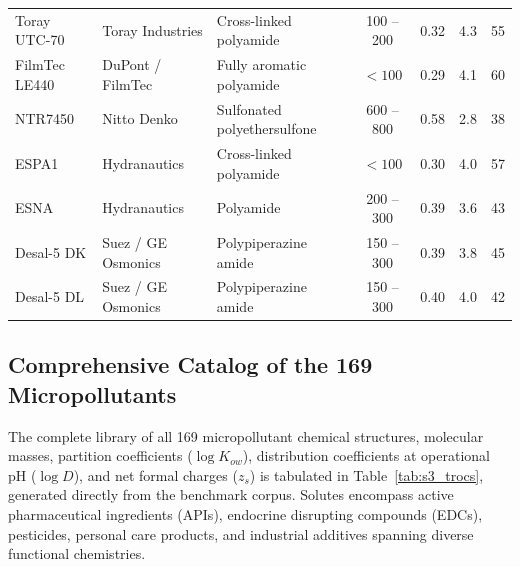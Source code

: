 \documentclass[11pt]{article}
\begin{document}
\begin{table}[H]
\begin{tabularx}{\textwidth}{>{\raggedright\arraybackslash}p{2.6cm} >{\raggedright\arraybackslash}p{2.8cm} >{\raggedright\arraybackslash}X c c c c}
Toray UTC-70     & Toray Industries           & Cross-linked polyamide      & 100 -- 200 & 0.32 & 4.3 & 55 \\
FilmTec LE440    & DuPont / FilmTec           & Fully aromatic polyamide    & $<100$     & 0.29 & 4.1 & 60 \\
NTR7450          & Nitto Denko                & Sulfonated polyethersulfone & 600 -- 800 & 0.58 & 2.8 & 38 \\
ESPA1            & Hydranautics               & Cross-linked polyamide      & $<100$     & 0.30 & 4.0 & 57 \\
ESNA             & Hydranautics               & Polyamide                   & 200 -- 300 & 0.39 & 3.6 & 43 \\
Desal-5 DK       & Suez / GE Osmonics         & Polypiperazine amide        & 150 -- 300 & 0.39 & 3.8 & 45 \\
Desal-5 DL       & Suez / GE Osmonics         & Polypiperazine amide        & 150 -- 300 & 0.40 & 4.0 & 42 \\
\bottomrule
\end{tabularx}
\end{table}

\subsection{Comprehensive Catalog of the 169 Micropollutants}
\label{sec:troc_catalog}
The complete library of all 169 micropollutant chemical structures, molecular masses, partition coefficients ($\log K_{ow}$), distribution coefficients at operational pH ($\log D$), and net formal charges ($z_s$) is tabulated in Table~\ref{tab:s3_trocs}, generated directly from the benchmark corpus. Solutes encompass active pharmaceutical ingredients (APIs), endocrine disrupting compounds (EDCs), pesticides, personal care products, and industrial additives spanning diverse functional chemistries.

\clearpage


\clearpage
\end{document}
